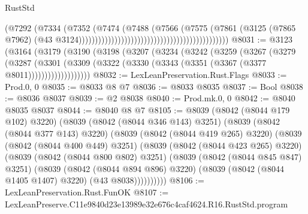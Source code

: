 \begin{lexlean}{RustStd}
\begin{coremodule}
                                                                            (@7292
                                                                              (@7334
                                                                                (@7352
                                                                                  (@7474
                                                                                    (@7488
                                                                                      (@7566
                                                                                        (@7575
                                                                                          (@7861
                                                                                            (@3125
                                                                                              (@7865
                                                                                                @7962)
                                                                                              (@43
                                                                                                @3124))))))))))))))))))))))))))))))))))))))))))))))
@8031 := @3123
    (@3164
      (@3179
        (@3190
          (@3198
            (@3207
              (@3234
                (@3242
                  (@3259
                    (@3267
                      (@3279
                        (@3287
                          (@3301
                            (@3309
                              (@3322 (@3330 (@3343 (@3351 (@3367 (@3377 @8011)))))))))))))))))))
@8032 := LexLeanPreservation.Rust.Flags
@8033 := Prod.{0, 0}
@8035 := @8033 @8 @7
@8036 := @8033 @8035
@8037 := Bool
@8038 := @8036 @8037
@8039 := @2 @8038
@8040 := Prod.mk.{0, 0}
@8042 := @8040 @8035 @8037
@8044 := @8040 @8 @7
@8105 := @8039
    (@8042 (@8044 @179 @102) @3220)
    (@8039
      (@8042 (@8044 @346 @143) @3251)
      (@8039
        (@8042 (@8044 @377 @143) @3220)
        (@8039
          (@8042 (@8044 @419 @265) @3220)
          (@8039
            (@8042 (@8044 @400 @449) @3251)
            (@8039
              (@8042 (@8044 @423 @265) @3220)
              (@8039
                (@8042 (@8044 @800 @802) @3251)
                (@8039
                  (@8042 (@8044 @845 @847) @3251)
                  (@8039
                    (@8042 (@8044 @894 @896) @3220)
                    (@8039 (@8042 (@8044 @1405 @1407) @3220) (@43 @8038))))))))))
@8106 := LexLeanPreservation.Rust.FunOK
@8107 := LexLeanPreserve.C11e9840d23e13989e32e676c4caf4624.R16.RustStd.program

\end{coremodule}
\end{lexlean}
